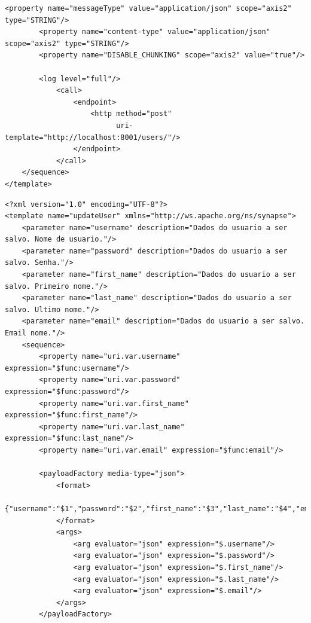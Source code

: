 \begin{apendicesenv}
\begin{lstlisting}[caption={Conteúdo do arquivo "saveUser.xml".}]
        <property name="messageType" value="application/json" scope="axis2" type="STRING"/>
        <property name="content-type" value="application/json" scope="axis2" type="STRING"/>
        <property name="DISABLE_CHUNKING" scope="axis2" value="true"/>

        <log level="full"/>
            <call>
                <endpoint>
                    <http method="post"
                          uri-template="http://localhost:8001/users/"/>
                </endpoint>
            </call>
    </sequence>
</template>
\end{lstlisting}


\begin{lstlisting}[caption={Conteúdo do arquivo "saveUser.xml".}]
<?xml version="1.0" encoding="UTF-8"?>
<template name="updateUser" xmlns="http://ws.apache.org/ns/synapse">
    <parameter name="username" description="Dados do usuario a ser salvo. Nome de usuario."/>
    <parameter name="password" description="Dados do usuario a ser salvo. Senha."/>
    <parameter name="first_name" description="Dados do usuario a ser salvo. Primeiro nome."/>
    <parameter name="last_name" description="Dados do usuario a ser salvo. Ultimo nome."/>
    <parameter name="email" description="Dados do usuario a ser salvo. Email nome."/>
    <sequence>
        <property name="uri.var.username" expression="$func:username"/>
        <property name="uri.var.password" expression="$func:password"/>
        <property name="uri.var.first_name" expression="$func:first_name"/>
        <property name="uri.var.last_name" expression="$func:last_name"/>
        <property name="uri.var.email" expression="$func:email"/>

        <payloadFactory media-type="json">
            <format>
                {"username":"$1","password":"$2","first_name":"$3","last_name":"$4","email":"$5"}
            </format>
            <args>
                <arg evaluator="json" expression="$.username"/>
                <arg evaluator="json" expression="$.password"/>
                <arg evaluator="json" expression="$.first_name"/>
                <arg evaluator="json" expression="$.last_name"/>
                <arg evaluator="json" expression="$.email"/>
            </args>
        </payloadFactory>


\end{lstlisting}
\end{apendicesenv}
